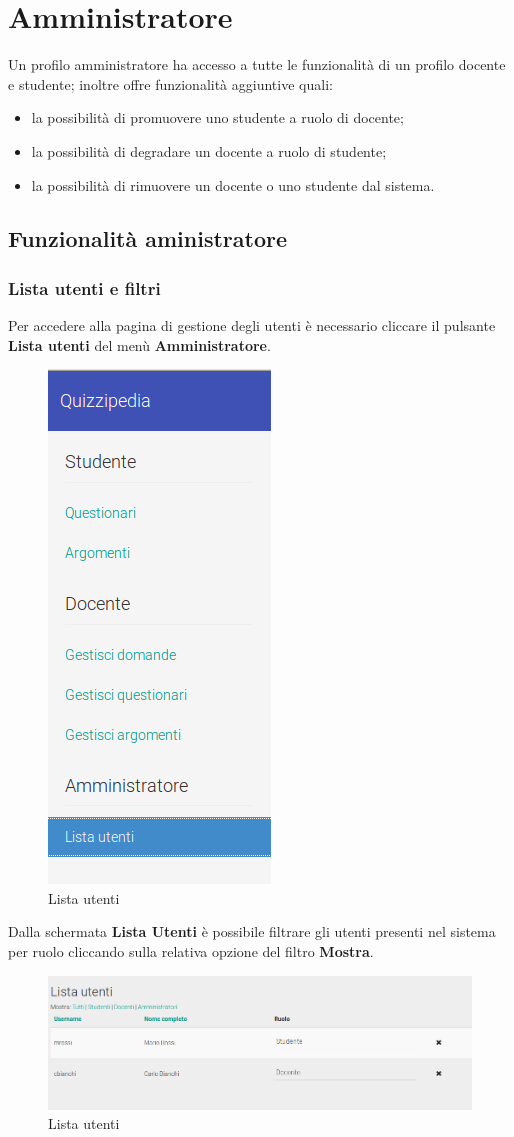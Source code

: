 \documentclass[12pt,a4paper]{article}
\begin{document}
	\newpage


		
	\section{Amministratore}
		\par Un profilo amministratore ha accesso a tutte le funzionalità di un profilo docente e studente; inoltre offre funzionalità aggiuntive quali: \\
		\begin{itemize}
			\item la possibilità di promuovere uno studente a ruolo di docente;
			\item la possibilità di degradare un docente a ruolo di studente;
			\item la possibilità di rimuovere un docente o uno studente dal sistema.
		\end{itemize}
		\subsection{Funzionalità aministratore}
		
	\subsubsection{Lista utenti e filtri}
		Per accedere alla pagina di gestione degli utenti è necessario cliccare il pulsante \textbf{Lista utenti} del menù \textbf{Amministratore}.
		\begin{figure}[H]
			\centering
			\includegraphics[width=0.2\linewidth]{../img/screenshot/usersListMenu.png}
			\caption{Lista utenti}
			\label{Lista utenti}
		\end{figure}
        Dalla schermata \textbf{Lista Utenti} è possibile filtrare gli utenti presenti nel sistema per ruolo cliccando sulla relativa opzione del filtro \textbf{Mostra}.
		\begin{figure}[H]
			
			\centering
			\includegraphics[width=1.0\linewidth]{../img/screenshot/usersListCrop.png}
			\caption{Lista utenti}
			\label{Lista utenti}
		\end{figure}
	
\end{document}
